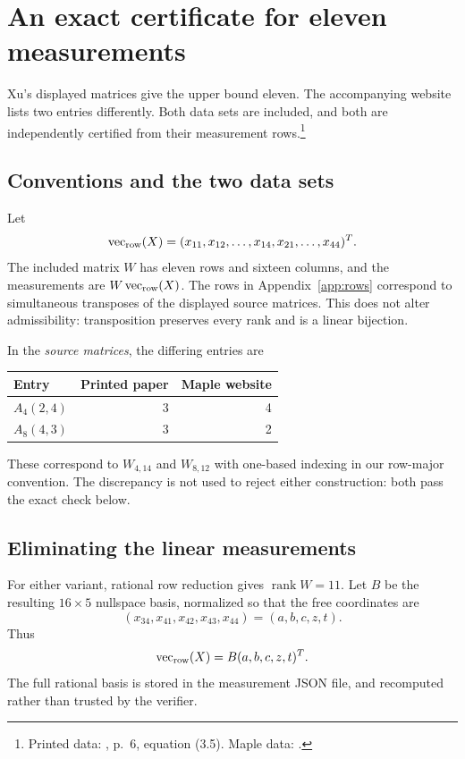 \documentclass[11pt]{article}
\theoremstyle{definition}
\newcommand{\rank}{\operatorname{rank}}
\begin{document}
\section{An exact certificate for eleven measurements}\label{sec:certificate}
Xu's displayed matrices give the upper bound eleven. The accompanying website lists two entries differently. Both data sets are included, and both are independently certified from their measurement rows.\footnote{Printed data: \cite{xu}, p.~6, equation (3.5). Maple data: \cite{xucode}.}

\subsection{Conventions and the two data sets}
Let
\[
 \operatorname{vec}_{\rm row}(X)=(x_{11},x_{12},\ldots,x_{14},x_{21},\ldots,x_{44})^T.
\]
The included matrix $W$ has eleven rows and sixteen columns, and the measurements are $W\operatorname{vec}_{\rm row}(X)$. The rows in Appendix~\ref{app:rows} correspond to simultaneous transposes of the displayed source matrices. This does not alter admissibility: transposition preserves every rank and is a linear bijection.

In the \emph{source matrices}, the differing entries are
\begin{center}
\begin{tabular}{lrr}
\toprule
Entry & Printed paper & Maple website\\
\midrule
$A_4(2,4)$ & 3 & 4\\
$A_8(4,3)$ & 3 & 2\\
\bottomrule
\end{tabular}
\end{center}
These correspond to $W_{4,14}$ and $W_{8,12}$ with one-based indexing in our row-major convention. The discrepancy is not used to reject either construction: both pass the exact check below.

\subsection{Eliminating the linear measurements}
For either variant, rational row reduction gives $\rank W=11$. Let $B$ be the resulting $16\times5$ nullspace basis, normalized so that the free coordinates are
\[
 (x_{34},x_{41},x_{42},x_{43},x_{44})=(a,b,c,z,t).
\]
Thus
\[
 \operatorname{vec}_{\rm row}(X)=B(a,b,c,z,t)^T.
\]
The full rational basis is stored in the measurement JSON file, and recomputed rather than trusted by the verifier.
\end{document}
